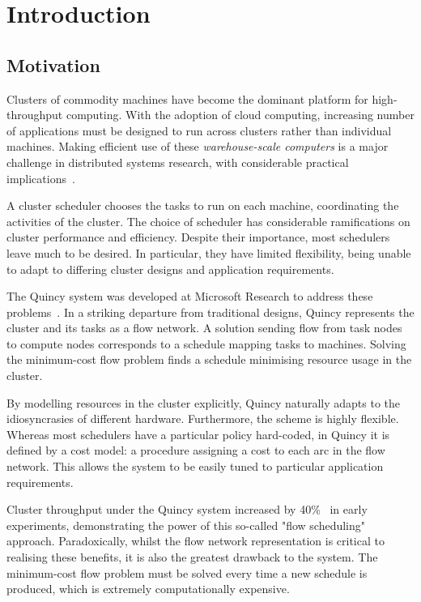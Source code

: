 \chapter{Introduction} \label{chap:intro}


\section{Motivation} \label{sec:intro-motivation}
Clusters of commodity machines have become the dominant platform for high-throughput computing. With the adoption of cloud computing, increasing number of applications must be designed to run across clusters rather than individual machines. Making efficient use of these \emph{warehouse-scale computers} is a major challenge in distributed systems research, with considerable practical implications~\cite{WarehouseScale:2009}.

A cluster scheduler chooses the tasks to run on each machine, coordinating the activities of the cluster. The choice of scheduler has considerable ramifications on cluster performance and efficiency. Despite their importance, most schedulers leave much to be desired. In particular, they have limited flexibility, being unable to adapt to differing cluster designs and application requirements.

The Quincy system was developed at Microsoft Research to address these problems~\cite{Isard:2009}. In a striking departure from traditional designs, Quincy represents the cluster and its tasks as a flow network. A solution sending flow from task nodes to compute nodes corresponds to a schedule mapping tasks to machines. Solving the minimum-cost flow problem finds a schedule minimising resource usage in the cluster.

By modelling resources in the cluster explicitly, Quincy naturally adapts to the idiosyncrasies of different hardware. Furthermore, the scheme is highly flexible. Whereas most schedulers have a particular policy hard-coded, in Quincy it is defined by a cost model: a procedure assigning a cost to each arc in the flow network. This allows the system to be easily tuned to particular application requirements.

Cluster throughput under the Quincy system increased by  40\%~\cite{Isard:2009} in early experiments, demonstrating the power of this so-called "flow scheduling" approach. Paradoxically, whilst the flow network representation is critical to realising these benefits, it is also the greatest drawback to the system. The minimum-cost flow problem must be solved every time a new schedule is produced, which is extremely computationally expensive.

